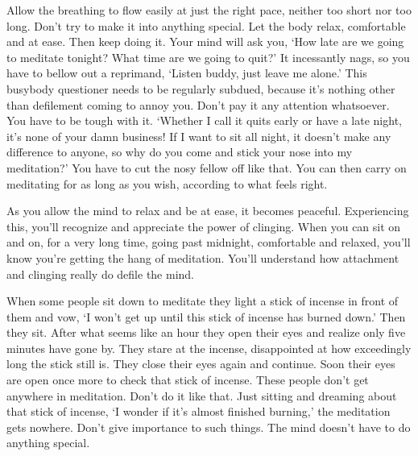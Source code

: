 Allow the breathing to flow easily at just the right pace, neither too short nor too long. Don't try to make it into anything special. Let the body relax, comfortable and at ease. Then keep doing it. Your mind will ask you, `How late are we going to meditate tonight? What time are we going to quit?' It incessantly nags, so you have to bellow out a reprimand, `Listen buddy, just leave me alone.' This busybody questioner needs to be regularly subdued, because it's nothing other than defilement coming to annoy you. Don't pay it any attention whatsoever. You have to be tough with it. `Whether I call it quits early or have a late night, it's none of your damn business! If I want to sit all night, it doesn't make any difference to anyone, so why do you come and stick your nose into my meditation?' You have to cut the nosy fellow off like that. You can then carry on meditating for as long as you wish, according to what feels right.

As you allow the mind to relax and be at ease, it becomes peaceful. Experiencing this, you'll recognize and appreciate the power of clinging. When you can sit on and on, for a very long time, going past midnight, comfortable and relaxed, you'll know you're getting the hang of meditation. You'll understand how attachment and clinging really do defile the mind.

When some people sit down to meditate they light a stick of incense in front of them and vow, `I won't get up until this stick of incense has burned down.' Then they sit. After what seems like an hour they open their eyes and realize only five minutes have gone by. They stare at the incense, disappointed at how exceedingly long the stick still is. They close their eyes again and continue. Soon their eyes are open once more to check that stick of incense. These people don't get anywhere in meditation. Don't do it like that. Just sitting and dreaming about that stick of incense, `I wonder if it's almost finished burning,' the meditation gets nowhere. Don't give importance to such things. The mind doesn't have to do anything special.

